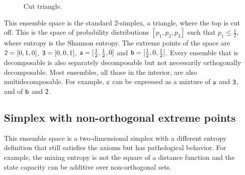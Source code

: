 \begin{figure}[H]
	\centering
	\caption{Cut triangle.}\label{pm-es-fig-cutTriangle}
\end{figure}

This ensemble space is the standard 2-simplex, a triangle, where the top is cut off. This is the space of probability distributions $[p_1, p_2, p_3]$ such that $p_1 \leq \frac{1}{2}$, where entropy is the Shannon entropy. The extreme points of the space are $\ens[2] = [0,1,0]$, $\ens[3] = [0,0,1]$, $\ens[a] = [\frac{1}{2},\frac{1}{2},0]$ and $\ens[b] = [\frac{1}{2},0,\frac{1}{2}]$. Every ensemble that is decomposable is also separately decomposable but not necessarily orthogonally decomposable. Most ensembles, all those in the interior, are also multidecomposable. For example, $\ens[c]$ can be expressed as a mixture of $\ens[a]$ and $\ens[3]$, and of $\ens[b]$ and $\ens[2]$.

\subsection{Simplex with non-orthogonal extreme points}

This ensemble space is a two-dimensional simplex with a different entropy definition that still satisfies the axioms but has pathological behavior. For example, the mixing entropy is not the square of a distance function and the state capacity can be additive over non-orthogonal sets.

